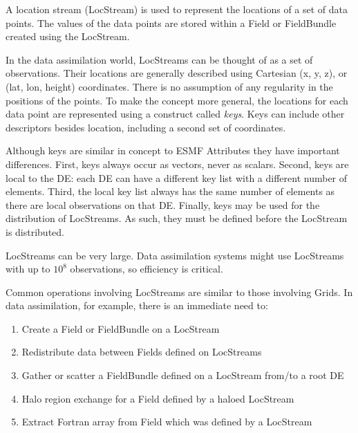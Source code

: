 %

A location stream (LocStream) is used to represent the locations of
a set of data points.  The values of the data points are stored within
a Field or FieldBundle created using the LocStream.

In the data assimilation world, LocStreams can
be thought of as a set of observations.  Their locations are generally
described using Cartesian (x, y, z), or (lat, lon, height) coordinates.
There is no assumption of any regularity in the positions of the points.
To make the concept more general, the locations for each data point are
represented using a construct called {\it keys}.  Keys can include other
descriptors besides location, including a second set of coordinates.

Although keys are similar in concept to ESMF Attributes they have important
differences. First, keys always occur as vectors, never as scalars.
Second, keys are local to the DE: each DE can have a different key
list with a different number of elements. Third, the local key 
list always has the same number of elements as there are local observations
on that DE.  Finally, keys may be used for the distribution of LocStreams.
As such, they must be defined before the LocStream is distributed.

LocStreams can be very large. Data assimilation systems might use
LocStreams with up to $10^{8}$ observations, so efficiency is critical.

Common operations involving LocStreams are similar to those involving Grids.
In data assimilation, for example, there is an immediate need to:

\begin{enumerate}
\item Create a Field or FieldBundle on a LocStream
\item Redistribute data between Fields defined on LocStreams
\item Gather or scatter a FieldBundle defined on a LocStream from/to a root DE
\item Halo region exchange for a Field defined by a haloed LocStream
\item Extract Fortran array from Field which was defined by a LocStream
\end{enumerate}

